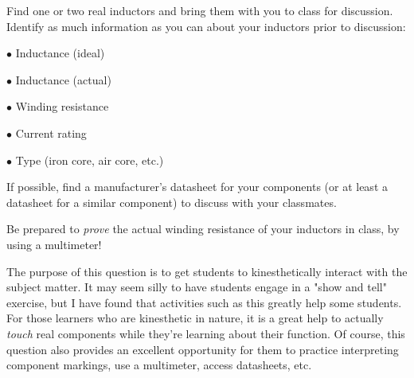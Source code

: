 

Find one or two real inductors and bring them with you to class for discussion.  Identify as much information as you can about your inductors prior to discussion:

\medskip
\item{$\bullet$} Inductance (ideal)
\item{$\bullet$} Inductance (actual)
\item{$\bullet$} Winding resistance
\item{$\bullet$} Current rating
\item{$\bullet$} Type (iron core, air core, etc.)
\medskip







If possible, find a manufacturer's datasheet for your components (or at least a datasheet for a similar component) to discuss with your classmates.

Be prepared to {\it prove} the actual winding resistance of your inductors in class, by using a multimeter!







The purpose of this question is to get students to kinesthetically interact with the subject matter.  It may seem silly to have students engage in a "show and tell" exercise, but I have found that activities such as this greatly help some students.  For those learners who are kinesthetic in nature, it is a great help to actually {\it touch} real components while they're learning about their function.  Of course, this question also provides an excellent opportunity for them to practice interpreting component markings, use a multimeter, access datasheets, etc.



